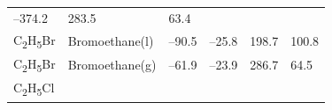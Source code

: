 \documentclass[
  9pt,
]{extbook}
\theoremstyle{definition}
\theoremstyle{definition}
\theoremstyle{definition}
\theoremstyle{remark}
\begin{document}
\begin{longtable}[]{@{}llllll@{}}
\begin{minipage}[t]{0.15\columnwidth}
--374.2\strut
\end{minipage} & \begin{minipage}[t]{0.14\columnwidth}\raggedright
283.5\strut
\end{minipage} & \begin{minipage}[t]{0.14\columnwidth}\raggedright
63.4\strut
\end{minipage}\tabularnewline
\begin{minipage}[t]{0.07\columnwidth}\raggedright
C\textsubscript{2}H\textsubscript{5}Br\strut
\end{minipage} & \begin{minipage}[t]{0.17\columnwidth}\raggedright
Bromoethane(l)\strut
\end{minipage} & \begin{minipage}[t]{0.15\columnwidth}\raggedright
--90.5\strut
\end{minipage} & \begin{minipage}[t]{0.15\columnwidth}\raggedright
--25.8\strut
\end{minipage} & \begin{minipage}[t]{0.14\columnwidth}\raggedright
198.7\strut
\end{minipage} & \begin{minipage}[t]{0.14\columnwidth}\raggedright
100.8\strut
\end{minipage}\tabularnewline
\begin{minipage}[t]{0.07\columnwidth}\raggedright
C\textsubscript{2}H\textsubscript{5}Br\strut
\end{minipage} & \begin{minipage}[t]{0.17\columnwidth}\raggedright
Bromoethane(g)\strut
\end{minipage} & \begin{minipage}[t]{0.15\columnwidth}\raggedright
--61.9\strut
\end{minipage} & \begin{minipage}[t]{0.15\columnwidth}\raggedright
--23.9\strut
\end{minipage} & \begin{minipage}[t]{0.14\columnwidth}\raggedright
286.7\strut
\end{minipage} & \begin{minipage}[t]{0.14\columnwidth}\raggedright
64.5\strut
\end{minipage}\tabularnewline
\begin{minipage}[t]{0.07\columnwidth}\raggedright
C\textsubscript{2}H\textsubscript{5}Cl\strut
\end{minipage} & \begin{minipage}[t]{0.17\columnwidth}\raggedright

\end{minipage}
\end{longtable}
\end{document}
